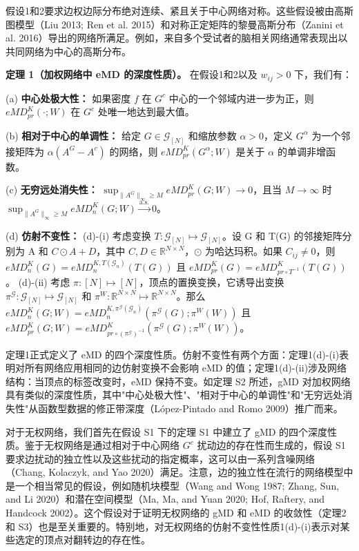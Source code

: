 \documentclass[
  10
]{article}
\begin{document}
假设1和2要求边权边际分布绝对连续、紧且关于中心网络对称。这些假设被由高斯图模型（Liu 2013; Ren et al. 2015）和对称正定矩阵的黎曼高斯分布（Zanini et al. 2016）导出的网络所满足。例如，来自多个受试者的脑相关网络通常表现出以共同网络为中心的高斯分布。

\textbf{定理 1（加权网络中 eMD 的深度性质）。} 在假设1和2以及 $w_{ij}>0$ 下，我们有：

(a) \textbf{中心处极大性：} 如果密度 $f$ 在 $G^c$ 中心的一个邻域内进一步为正，则 $eMD_{pr}^K(\cdot;W)$ 在 $G^c$ 处唯一地达到最大值。

(b) \textbf{相对于中心的单调性：} 给定 $G\in\mathcal{G}_{[N]}$ 和缩放参数 $\alpha>0$，定义 $G^\alpha$ 为一个邻接矩阵为 $\alpha(A^G-A^c)$ 的网络，则 $eMD_{pr}^K(G^\alpha;W)$ 是关于 $\alpha$ 的单调非增函数。

(c) \textbf{无穷远处消失性：} $\sup_{\lVert A^G\rVert_\infty\geq M} eMD_{pr}^K(G;W)\to 0$，且当 $M\to\infty$ 时 $\sup_{\lVert A^G\rVert_\infty\geq M} eMD_n^K(G;W)\xrightarrow{\mathrm{a.s.}} 0$。

(d) \textbf{仿射不变性：}
(d)-(i) 考虑变换 $T:\mathcal{G}_{[N]}\mapsto\mathcal{G}_{[N]}$。设 G 和 T(G) 的邻接矩阵分别为 A 和 $C\odot A+D$，其中 $C,D\in\mathbb{R}^{N\times N}$，$\odot$ 为哈达玛积。如果 $C_{ij}\neq 0$，则 $eMD_n^K(G)=eMD_n^{K,T(\mathcal{G}_n)}(T(G))$ 且 $eMD_{pr}^K(G)=eMD_{pr\circ T^{-1}}^K(T(G))$。
(d)-(ii) 考虑 $\pi:[N]\mapsto[N]$，顶点的置换变换，它诱导出变换 $\pi^\mathcal{G}:\mathcal{G}_{[N]}\mapsto\mathcal{G}_{[N]}$ 和 $\pi^W:\mathbb{R}^{N\times N}\mapsto\mathbb{R}^{N\times N}$。那么 $eMD_n^K(G;W)=eMD_n^{K,\pi^\mathcal{G}(\mathcal{G}_n)}(\pi^\mathcal{G}(G);\pi^W(W))$ 且 $eMD_{pr}^K(G;W)=eMD_{pr\circ(\pi^\mathcal{G})^{-1}}^K(\pi^\mathcal{G}(G);\pi^W(W))$。

定理1正式定义了 eMD 的四个深度性质。仿射不变性有两个方面：定理1(d)-(i)表明对所有网络应用相同的边仿射变换不会影响 eMD 的值；定理1(d)-(ii)涉及网络结构：当顶点的标签改变时，eMD 保持不变。如定理 S2 所述，gMD 对加权网络具有类似的深度性质，其中"中心处极大性"、"相对于中心的单调性"和"无穷远处消失性"从函数型数据的修正带深度（López-Pintado and Romo 2009）推广而来。

对于无权网络，我们首先在假设 S1 下的定理 S1 中建立了 gMD 的四个深度性质。鉴于无权网络是通过相对于中心网络 $G^c$ 扰动边的存在性而生成的，假设 S1 要求边扰动的独立性以及这些扰动的指定概率，这可以由一系列含噪网络（Chang, Kolaczyk, and Yao 2020）满足。注意，边的独立性在流行的网络模型中是一个相当常见的假设，例如随机块模型（Wang and Wong 1987; Zhang, Sun, and Li 2020）和潜在空间模型（Ma, Ma, and Yuan 2020; Hof, Raftery, and Handcock 2002）。这个假设对于证明无权网络的 gMD 和 eMD 的收敛性（定理2和 S3）也是至关重要的。特别地，对无权网络的仿射不变性性质1(d)-(i)表示对某些选定的顶点对翻转边的存在性。
\end{document}
